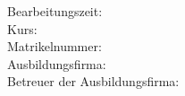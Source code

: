 \begin{titlepage}
\begin{center}
\begin{minipage}{\textwidth}
	\begin{tabbing}
			Bearbeitungszeit:  \DieBearbeitungszeit\\[1.5mm]
			Kurs: \DieKursbezeichnung \\[1.5mm]
			Matrikelnummer:  \DieMatrikelnummer \\[1.5mm]
			Ausbildungsfirma: \indent \DerNameDerFirma  \\[1.5mm]
			Betreuer der Ausbildungsfirma: \DerFirmenBetreuer \\[1.5mm]
	\end{tabbing}
\end{minipage}
\end{center}
\end{titlepage}